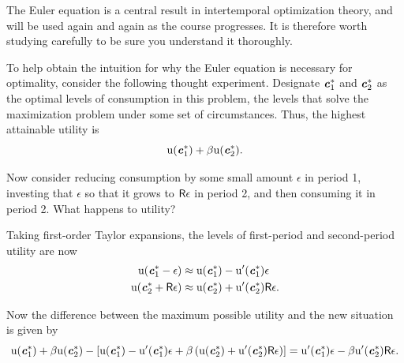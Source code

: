 \documentclass{scrartcl}
\begin{document}
  The Euler equation is a central result in intertemporal optimization theory, and will be used again and again as the course progresses.  It is therefore worth studying carefully to be sure you understand it thoroughly.

  To help obtain the intuition for why the Euler equation is necessary for optimality, consider the following thought experiment.  Designate $\boldsymbol{\mathit{c}}^{*}_{1}$ and $\boldsymbol{\mathit{c}}^{*}_{2}$ as the optimal levels of consumption in this problem, the levels that solve the maximization problem under some set of circumstances.  Thus, the highest attainable utility is
  \begin{equation} \mathrm{u}(\boldsymbol{\mathit{c}}_{1}^{*})+\beta \mathrm{u}(\boldsymbol{\mathit{c}}_{2}^{*}) \label{eq:maxutil}.
  \end{equation}

  Now consider reducing consumption by some small amount $\epsilon$ in period 1, investing that $\epsilon$ so that it grows to $\mathsf{R} \epsilon$ in period 2, and then consuming it in period 2.  What happens to utility?

  Taking first-order Taylor expansions, the levels of first-period and second-period utility are now
  \begin{equation}\begin{gathered}\begin{aligned} \mathrm{u}(\boldsymbol{\mathit{c}}_{1}^{*}-\epsilon) & \approx \mathrm{u}(\boldsymbol{\mathit{c}}_{1}^{*})-\mathrm{u}^{\prime}(\boldsymbol{\mathit{c}}_{1}^{*})\epsilon \\ \mathrm{u}(\boldsymbol{\mathit{c}}_{2}^{*}+\mathsf{R}\epsilon) & \approx \mathrm{u}(\boldsymbol{\mathit{c}}_{2}^{*})+\mathrm{u}^{\prime}(\boldsymbol{\mathit{c}}_{2}^{*})\mathsf{R}\epsilon.
      \end{aligned}\end{gathered}\end{equation}

  Now the difference between the maximum possible utility and the new situation is given by
  \begin{equation} \mathrm{u}(\boldsymbol{\mathit{c}}_{1}^{*})+\beta \mathrm{u}(\boldsymbol{\mathit{c}}_{2}^{*}) - \left[\mathrm{u}(\boldsymbol{\mathit{c}}_{1}^{*})-\mathrm{u}^{\prime}(\boldsymbol{\mathit{c}}_{1}^{*})\epsilon + \beta \left(\mathrm{u}(\boldsymbol{\mathit{c}}_{2}^{*})+\mathrm{u}^{\prime}(\boldsymbol{\mathit{c}}_{2}^{*})\mathsf{R}\epsilon \right) \right] = \mathrm{u}^{\prime}(\boldsymbol{\mathit{c}}_{1}^{*})\epsilon - \beta \mathrm{u}^{\prime}(\boldsymbol{\mathit{c}}_{2}^{*})\mathsf{R}\epsilon \label{eq:diffutil}.
  \end{equation}
\end{document}
